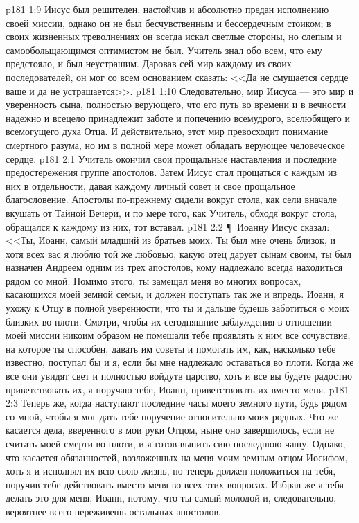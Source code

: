 \vs p181 1:9 Иисус был решителен, настойчив и абсолютно предан исполнению своей миссии, однако он не был бесчувственным и бессердечным стоиком; в своих жизненных треволнениях он всегда искал светлые стороны, но слепым и самообольщающимся оптимистом не был. Учитель знал обо всем, что ему предстояло, и был неустрашим. Даровав сей мир каждому из своих последователей, он мог со всем основанием сказать: <<Да не смущается сердце ваше и да не устрашается>>.
\vs p181 1:10 Следовательно, мир Иисуса --- это мир и уверенность сына, полностью верующего, что его путь во времени и в вечности надежно и всецело принадлежит заботе и попечению всемудрого, вселюбящего и всемогущего духа Отца. И действительно, этот мир превосходит понимание смертного разума, но им в полной мере может обладать верующее человеческое сердце.
\vs p181 2:1 Учитель окончил свои прощальные наставления и последние предостережения группе апостолов. Затем Иисус стал прощаться с каждым из них в отдельности, давая каждому личный совет и свое прощальное благословение. Апостолы по\hyp{}прежнему сидели вокруг стола, как сели вначале вкушать от Тайной Вечери, и по мере того, как Учитель, обходя вокруг стола, обращался к каждому из них, тот вставал.
\vs p181 2:2 \P\ Иоанну Иисус сказал: <<Ты, Иоанн, самый младший из братьев моих. Ты был мне очень близок, и хотя всех вас я люблю той же любовью, какую отец дарует сынам своим, ты был назначен Андреем одним из трех апостолов, кому надлежало всегда находиться рядом со мной. Помимо этого, ты замещал меня во многих вопросах, касающихся моей земной семьи, и должен поступать так же и впредь. Иоанн, я ухожу к Отцу в полной уверенности, что ты и дальше будешь заботиться о моих близких во плоти. Смотри, чтобы их сегодняшние заблуждения в отношении моей миссии никоим образом не помешали тебе проявлять к ним все сочувствие, на которое ты способен, давать им советы и помогать им, как, насколько тебе известно, поступал бы и я, если бы мне надлежало оставаться во плоти. Когда же все они увидят свет и полностью войдутв царство, хоть и все вы будете радостно приветствовать их, я поручаю тебе, Иоанн, приветствовать их вместо меня.
\vs p181 2:3 Теперь же, когда наступают последние часы моего земного пути, будь рядом со мной, чтобы я мог дать тебе поручение относительно моих родных. Что же касается дела, вверенного в мои руки Отцом, ныне оно завершилось, если не считать моей смерти во плоти, и я готов выпить сию последнюю чашу. Однако, что касается обязанностей, возложенных на меня моим земным отцом Иосифом, хоть я и исполнял их всю свою жизнь, но теперь должен положиться на тебя, поручив тебе действовать вместо меня во всех этих вопросах. Избрал же я тебя делать это для меня, Иоанн, потому, что ты самый молодой и, следовательно, вероятнее всего переживешь остальных апостолов.
